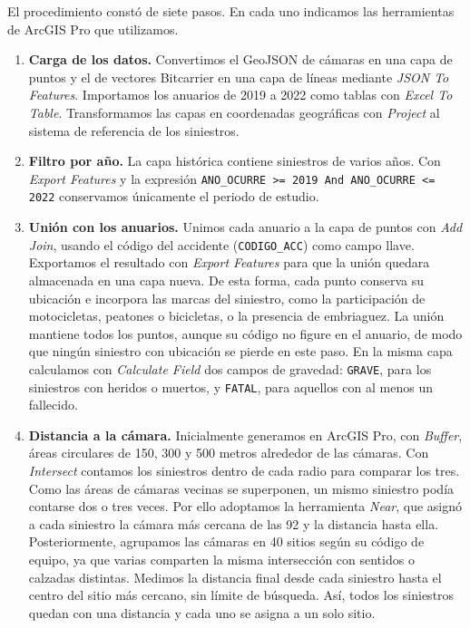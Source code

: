 \documentclass[10pt,a4paper]{article}
\begin{document}
El procedimiento constó de siete pasos. En cada uno indicamos las herramientas de ArcGIS Pro que utilizamos.

\begin{enumerate}
\item \textbf{Carga de los datos.} Convertimos el GeoJSON de cámaras en una capa de puntos y el de vectores Bitcarrier en una capa de líneas mediante \textit{JSON To Features}. Importamos los anuarios de 2019 a 2022 como tablas con \textit{Excel To Table}. Transformamos las capas en coordenadas geográficas con \textit{Project} al sistema de referencia de los siniestros.

\item \textbf{Filtro por año.} La capa histórica contiene siniestros de varios años. Con \textit{Export Features} y la expresión \texttt{ANO\_OCURRE >= 2019 And ANO\_OCURRE <= 2022} conservamos únicamente el periodo de estudio.

\item \textbf{Unión con los anuarios.} Unimos cada anuario a la capa de puntos con \textit{Add Join}, usando el código del accidente (\texttt{CODIGO\_ACC}) como campo llave. Exportamos el resultado con \textit{Export Features} para que la unión quedara almacenada en una capa nueva. De esta forma, cada punto conserva su ubicación e incorpora las marcas del siniestro, como la participación de motocicletas, peatones o bicicletas, o la presencia de embriaguez. La unión mantiene todos los puntos, aunque su código no figure en el anuario, de modo que ningún siniestro con ubicación se pierde en este paso. En la misma capa calculamos con \textit{Calculate Field} dos campos de gravedad: \texttt{GRAVE}, para los siniestros con heridos o muertos, y \texttt{FATAL}, para aquellos con al menos un fallecido.

\item \textbf{Distancia a la cámara.} Inicialmente generamos en ArcGIS Pro, con \textit{Buffer}, áreas circulares de 150, 300 y 500 metros alrededor de las cámaras. Con \textit{Intersect} contamos los siniestros dentro de cada radio para comparar los tres. Como las áreas de cámaras vecinas se superponen, un mismo siniestro podía contarse dos o tres veces. Por ello adoptamos la herramienta \textit{Near}, que asignó a cada siniestro la cámara más cercana de las 92 y la distancia hasta ella. Posteriormente, agrupamos las cámaras en 40 sitios según su código de equipo, ya que varias comparten la misma intersección con sentidos o calzadas distintas. Medimos la distancia final desde cada siniestro hasta el centro del sitio más cercano, sin límite de búsqueda. Así, todos los siniestros quedan con una distancia y cada uno se asigna a un solo sitio.


\end{enumerate}
\end{document}
